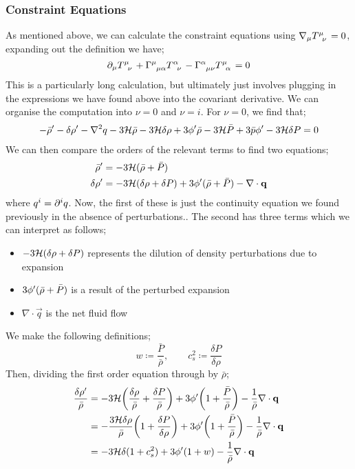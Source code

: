 \subsubsection{Constraint Equations}
As mentioned above, we can calculate the constraint equations using $\nabla_\mu T\indices{^{\mu}_{\nu}} = 0$, expanding out the definition we have;
\begin{equation*}
\del_\mu T\indices{^{\mu}_{\nu}} + \Gamma\indices{^{\mu}_{\mu \alpha}}T\indices{^{\alpha}_{\nu}} - \Gamma\indices{^{\alpha}_{\mu\nu}}T\indices{^{\mu}_{\alpha}} = 0
\end{equation*}
This is a particularly long calculation, but ultimately just involves plugging in the expressions we have found above into the covariant derivative. We can organise the computation into $\nu = 0$ and $\nu = i$. For $\nu = 0$, we find that;
\begin{multline*}
-\bar{\rho}^{\prime} - \delta \rho^{\prime} - \nabla^2 q - 3\mathcal{H} \bar{\rho} - 3\mathcal{H} \delta \rho + 3\phi^{\prime} \bar{\rho} - 3\mathcal{H} \bar{P} + 3\bar{p}\phi^{\prime} - 3\mathcal{H} \delta P = 0
\end{multline*}
We can then compare the orders of the relevant terms to find two equations;
\begin{align*}
\bar{\rho}^{\prime} &= -3\mathcal{H} (\bar{\rho} + \bar{P}) \\
\delta \rho ^{\prime} &= -3\mathcal{H}(\delta \rho + \delta P) + 3\phi^{\prime}(\bar{\rho} + \bar{P}) - \nabla \cdot \mathbf{q}
\end{align*}
where $q^i = \partial^i q$. Now, the first of these is just the continuity equation we found previously in the absence of perturbations.. The second has three terms which we can interpret as follows;
\begin{itemize}
\item $-3\mathcal{H}(\delta\rho + \delta P)$ represents the dilution of density perturbations due to expansion
\item $3\phi^{\prime}(\bar{\rho} + \bar{P})$ is a result of the perturbed expansion
\item $\nabla \cdot \vec{q}$ is the net fluid flow
\end{itemize}
We make the following definitions;
\begin{equation}
w \coloneqq \frac{\bar{P}}{\bar{\rho}}, \qquad c_s^2 \coloneqq \frac{\delta P}{\delta \rho}
\end{equation}
Then, dividing the first order equation through by $\bar{\rho}$;
\begin{align*}
\frac{\delta \rho\pr}{\bar{\rho}} &= -3\hamilt\left(\frac{\delta \rho}{\bar{\rho}} + \frac{\delta P}{\bar{\rho}}\right) + 3\phi\pr\left(1 + \frac{\bar{P}}{\bar{\rho}}\right) - \frac{1}{\bar{\rho}}\nabla\cdot\vec{q} \\
&= - \frac{3\hamilt \delta \rho}{\bar{\rho}}\left(1 + \frac{\delta P}{\delta \rho}\right) + 3\phi\pr\left(1 + \frac{\bar{P}}{\bar{\rho}}\right) - \frac{1}{\bar{\rho}}\nabla\cdot \vec{q} \\
&= - 3\hamilt \delta (1 + c_s^2) + 3\phi\pr(1 + w) - \frac{1}{\bar{\rho}}\nabla\cdot\vec{q}
\end{align*}
